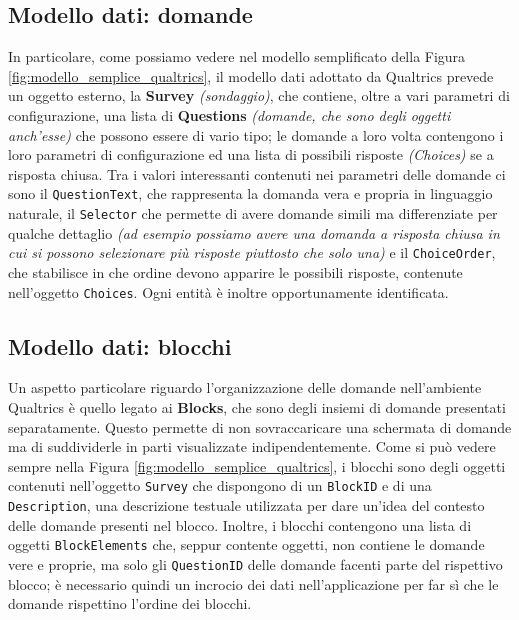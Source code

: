 \subsection{Modello dati: domande}
In particolare, come possiamo vedere nel modello semplificato della Figura \ref{fig:modello_semplice_qualtrics}, il modello dati adottato da Qualtrics prevede un oggetto esterno, la \textbf{Survey} \textit{(sondaggio)}, che contiene, oltre a vari parametri di configurazione, una lista di \textbf{Questions} \textit{(domande, che sono degli oggetti anch'esse)} che possono essere di vario tipo; le domande a loro volta contengono i loro parametri di configurazione ed una lista di possibili risposte \textit{(Choices)} se a risposta chiusa.
Tra i valori interessanti contenuti nei parametri delle domande ci sono il \texttt{QuestionText}, che rappresenta la domanda vera e propria in linguaggio naturale, il \texttt{Selector} che permette di avere domande simili ma differenziate per qualche dettaglio \textit{(ad esempio possiamo avere una domanda a risposta chiusa in cui si possono selezionare più risposte piuttosto che solo una)} e il \texttt{ChoiceOrder}, che stabilisce in che ordine devono apparire le possibili risposte, contenute nell'oggetto \texttt{Choices}.
Ogni entità è inoltre opportunamente identificata.

\newpage

\subsection{Modello dati: blocchi}
\label{subsection:blocchi}
Un aspetto particolare riguardo l'organizzazione delle domande nell'ambiente Qualtrics è quello legato ai \textbf{Blocks}, che sono degli insiemi di domande presentati separatamente. Questo permette di non sovraccaricare una schermata di domande ma di suddividerle in parti visualizzate indipendentemente.
Come si può vedere sempre nella Figura \ref{fig:modello_semplice_qualtrics}, i blocchi sono degli oggetti contenuti nell'oggetto \texttt{Survey} che dispongono di un \texttt{BlockID} e di una \texttt{Description}, una descrizione testuale utilizzata per dare un'idea del contesto delle domande presenti nel blocco. Inoltre, i blocchi contengono una lista di oggetti \texttt{BlockElements} che, seppur contente oggetti, non contiene le domande vere e proprie, ma solo gli \texttt{QuestionID} delle domande facenti parte del rispettivo blocco; è necessario quindi un incrocio dei dati nell'applicazione per far sì che le domande rispettino l'ordine dei blocchi.


